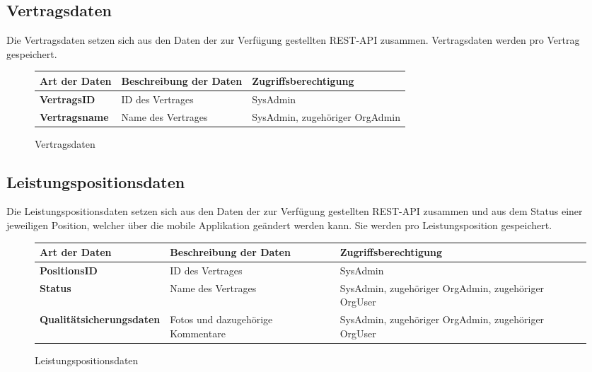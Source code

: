 \subsection{Vertragsdaten}

Die Vertragsdaten setzen sich aus den Daten der zur Verf\"ugung gestellten REST-API zusammen. Vertragsdaten werden pro Vertrag gespeichert.

\begin{figure}[h]
	\centering
	\begin{tabularx}{\textwidth}{| X || X | X |}
        \hline
		\textbf{Art der Daten} & \textbf{Beschreibung der Daten} & \textbf{Zugriffsberechtigung} \\ \hline \hline
		\textbf{VertragsID} & ID des Vertrages & SysAdmin \\ \hline
		\textbf{Vertragsname} & Name des Vertrages & SysAdmin, zugehöriger OrgAdmin \\ \hline
	\end{tabularx}
	\caption{Vertragsdaten}
	\label{fig:Vertragsdaten}
\end{figure}

\newpage

\subsection{Leistungspositionsdaten}

Die Leistungspositionsdaten setzen sich aus den Daten der zur Verf\"ugung gestellten REST-API zusammen und aus dem Status einer jeweiligen Position, welcher über die mobile Applikation geändert werden kann.
Sie werden pro Leistungsposition gespeichert.

\begin{figure}[h]
	\centering
	\begin{tabularx}{\textwidth}{| X || X | X |}
        \hline
		\textbf{Art der Daten} & \textbf{Beschreibung der Daten} & \textbf{Zugriffsberechtigung} \\ \hline \hline
		\textbf{PositionsID} & ID des Vertrages & SysAdmin \\ \hline
		\textbf{Status} & Name des Vertrages & SysAdmin, zugehöriger OrgAdmin, zugehöriger OrgUser \\ \hline
		\textbf{Qualitätsicherungsdaten} & Fotos und dazugehörige Kommentare & SysAdmin, zugehöriger OrgAdmin, zugehöriger OrgUser \\ \hline
	\end{tabularx}
	\caption{Leistungspositionsdaten}
	\label{fig:Leistungspositionsdaten}
\end{figure}